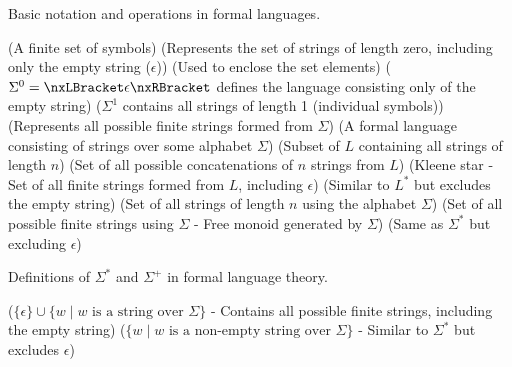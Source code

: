 \begin{NxSSSSBox}
	\begin{NxIDBox}
		Basic notation and operations in formal languages.
		\begin{NxListDark}
			 (A finite set of symbols)
			 (Represents the set of strings of length zero, including only the empty string ($\epsilon$))
			 (Used to enclose the set elements)
			 ($\Sigma^0 = \nxLBracket \epsilon \nxRBracket$ defines the language consisting only of the empty string)
			 ($\Sigma^1$ contains all strings of length 1 (individual symbols))
			 (Represents all possible finite strings formed from $\Sigma$)
			 (A formal language consisting of strings over some alphabet $\Sigma$)
			 (Subset of $L$ containing all strings of length $n$)
			 (Set of all possible concatenations of $n$ strings from $L$)
			 (Kleene star - Set of all finite strings formed from $L$, including $\epsilon$)
			 (Similar to $L^*$ but excludes the empty string)
			 (Set of all strings of length $n$ using the alphabet $\Sigma$)
			\nxIDSTopic{$\Sigma^*$} (Set of all possible finite strings using $\Sigma$ - Free monoid generated by $\Sigma$)
			\nxIDSTopic{$\Sigma^+$} (Same as $\Sigma^*$ but excluding $\epsilon$)
		\end{NxListDark}
	\end{NxIDBox}
\end{NxSSSSBox}

\begin{NxSSSSBox}
	\begin{NxIDBox}
		Definitions of $\Sigma^*$ and $\Sigma^+$ in formal language theory.
		\begin{NxListDark}
			\nxIDSTopic{$\Sigma^*$} ($\{\epsilon\} \cup \{w \mid w \text{ is a string over } \Sigma\}$ - Contains all possible finite strings, including the empty string)
			\nxIDSTopic{$\Sigma^+$} ($\{w \mid w \text{ is a non-empty string over } \Sigma\}$ - Similar to $\Sigma^*$ but excludes $\epsilon$)
		\end{NxListDark}
	\end{NxIDBox}
\end{NxSSSSBox}

